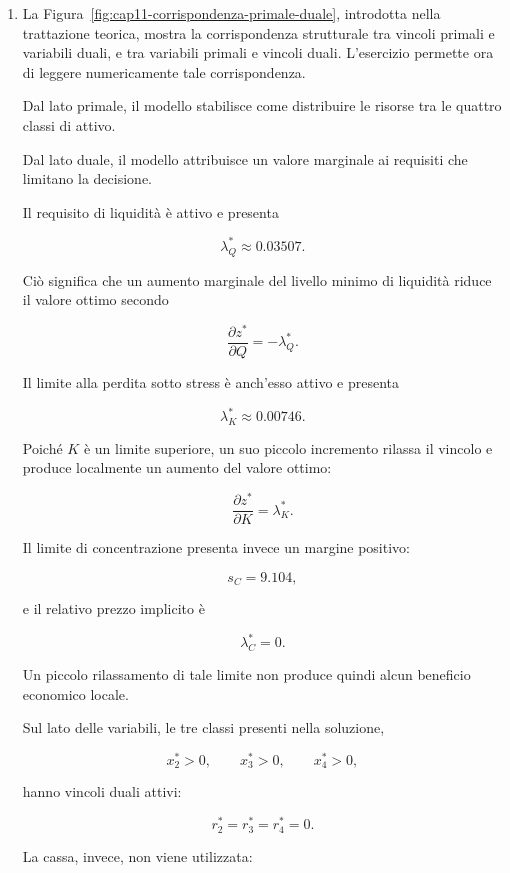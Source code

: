 \begin{enumerate}
La complementariet\`a mostra quindi una relazione precisa: le attivit\`a
presenti nella soluzione ottima hanno vincoli duali saturi, mentre una
attivit\`a assente pu\`o presentare uno scarto duale positivo.

\item La Figura~\ref{fig:cap11-corrispondenza-primale-duale}, introdotta nella
trattazione teorica, mostra la corrispondenza strutturale tra vincoli primali
e variabili duali, e tra variabili primali e vincoli duali. L'esercizio
permette ora di leggere numericamente tale corrispondenza.

Dal lato primale, il modello stabilisce come distribuire le risorse tra le
quattro classi di attivo.

Dal lato duale, il modello attribuisce un valore marginale ai requisiti che
limitano la decisione.

Il requisito di liquidit\`a \`e attivo e presenta

\[
\lambda_Q^*
\approx
0.03507.
\]

Ci\`o significa che un aumento marginale del livello minimo di liquidit\`a
riduce il valore ottimo secondo

\[
\frac{\partial z^*}{\partial Q}
=
-\lambda_Q^*.
\]

Il limite alla perdita sotto stress \`e anch'esso attivo e presenta

\[
\lambda_K^*
\approx
0.00746.
\]

Poich\'e $K$ \`e un limite superiore, un suo piccolo incremento rilassa il
vincolo e produce localmente un aumento del valore ottimo:

\[
\frac{\partial z^*}{\partial K}
=
\lambda_K^*.
\]

Il limite di concentrazione presenta invece un margine positivo:

\[
s_C
=
9.104,
\]

e il relativo prezzo implicito \`e

\[
\lambda_C^*
=
0.
\]

Un piccolo rilassamento di tale limite non produce quindi alcun beneficio
economico locale.

Sul lato delle variabili, le tre classi presenti nella soluzione,

\[
x_2^*>0,
\qquad
x_3^*>0,
\qquad
x_4^*>0,
\]

hanno vincoli duali attivi:

\[
r_2^*
=
r_3^*
=
r_4^*
=
0.
\]

La cassa, invece, non viene utilizzata:


\end{enumerate}
